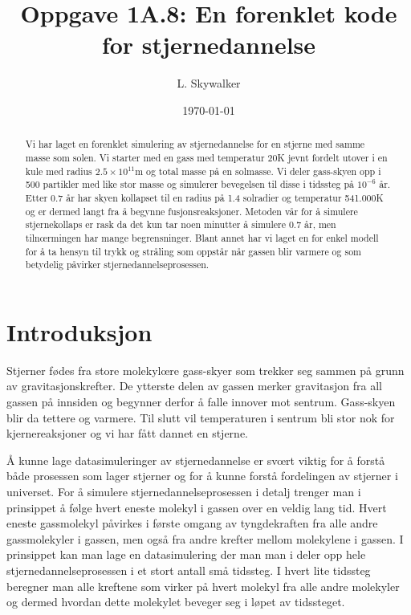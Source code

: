 \documentclass[reprint,english,notitlepage]{revtex4-1}  %
\begin{document}
\title{Oppgave 1A.8: En forenklet kode for stjernedannelse}
\date{\today}               
\author{L. Skywalker}


\newpage

\begin{abstract}
Vi har laget en forenklet simulering av stjernedannelse for en stjerne med samme masse som solen. Vi starter med en gass
med temperatur $20$K jevnt fordelt utover i en kule med radius $2.5\times10^{11}$m og total masse på en solmasse.
Vi deler gass-skyen opp i 500 partikler med like stor masse og simulerer bevegelsen til disse i tidssteg på $10^{-6}$ år.
Etter 0.7 år har skyen kollapset til en radius på 1.4 solradier og temperatur 541.000K og er dermed langt fra å begynne fusjonsreaksjoner.
Metoden vår for å simulere stjernekollaps er rask da det kun tar noen minutter å simulere 0.7 år, men tilnœrmingen har
mange begrensninger. Blant annet har vi laget en for enkel modell for å ta hensyn til trykk og stråling som oppstår når gassen blir varmere og som betydelig påvirker stjernedannelseprosessen.
\end{abstract}
\maketitle                                %



\section{Introduksjon}
\label{sect:intro}

Stjerner fødes fra store molekylœre gass-skyer som trekker seg sammen på grunn av gravitasjonskrefter.
De ytterste delen av gassen merker gravitasjon fra all gassen på innsiden og begynner derfor å falle 
innover mot sentrum. Gass-skyen blir da tettere og varmere. Til slutt vil temperaturen i sentrum bli
stor nok for kjernereaksjoner og vi har fått dannet en stjerne.

Å kunne lage datasimuleringer av stjernedannelse er svœrt viktig for å forstå både prosessen
som lager stjerner og for å kunne forstå fordelingen av stjerner i universet. For å simulere
stjernedannelseprosessen i detalj trenger man i prinsippet å følge hvert eneste molekyl i gassen
over en veldig lang tid. Hvert eneste gassmolekyl påvirkes i første omgang av tyngdekraften fra alle 
andre gassmolekyler i gassen, men også fra andre krefter mellom molekylene i gassen. I prinsippet kan
man lage en datasimulering der man man i deler opp hele stjernedannelseprosessen i et stort antall
små tidssteg. I hvert lite tidssteg beregner man alle kreftene som virker på hvert molekyl fra
alle andre molekyler og dermed hvordan dette molekylet beveger seg i løpet av tidssteget.
\end{document}
